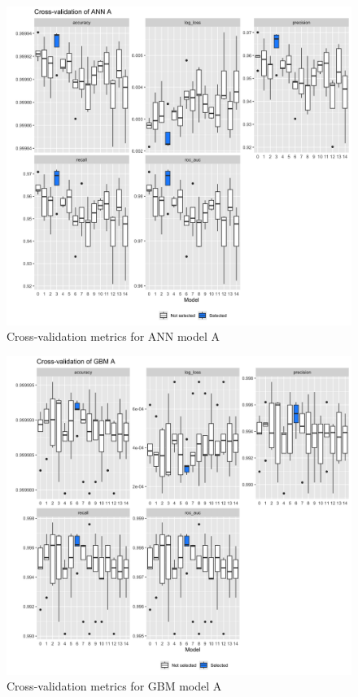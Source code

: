 \documentclass{article}
\begin{document}
\begin{figure}[H]
\centering
\includegraphics[width=0.9\linewidth]{boxplot_a_ann.png} 
\caption{Cross-validation metrics for ANN model A}
\label{cv_a_ann}
\end{figure}

\begin{figure}[H]
\centering
\includegraphics[width=0.9\linewidth]{boxplot_a_gbm.png} 
\caption{Cross-validation metrics for GBM model A}
\label{cv_a_gbm}
\end{figure}
\end{document}
